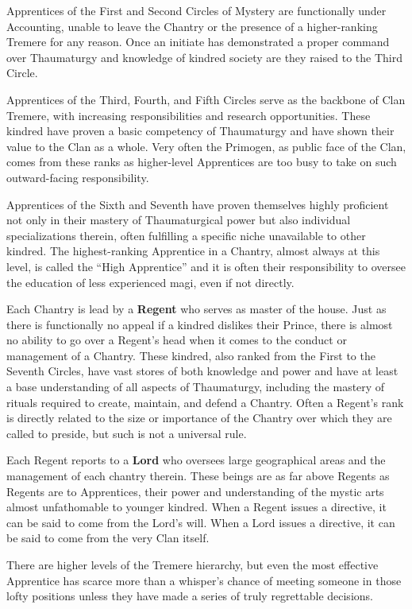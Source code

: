 Apprentices of the First and Second Circles of Mystery are functionally under Accounting, 
unable to leave the Chantry or the presence of a higher-ranking Tremere for any reason.  
Once an initiate has demonstrated a proper command over Thaumaturgy and knowledge of 
kindred society are they raised to the Third Circle.

Apprentices of the Third, Fourth, and Fifth Circles serve as the backbone of Clan Tremere, 
with increasing responsibilities and research opportunities.  These kindred have proven a 
basic competency of Thaumaturgy and have shown their value to the Clan as a whole.  Very 
often the Primogen, as public face of the Clan, comes from these ranks as higher-level 
Apprentices are too busy to take on such outward-facing responsibility.

Apprentices of the Sixth and Seventh have proven themselves highly proficient not only in 
their mastery of Thaumaturgical power but also individual specializations therein, often 
fulfilling a specific niche unavailable to other kindred.  The highest-ranking Apprentice 
in a Chantry, almost always at this level, is called the ``High Apprentice'' and it is 
often their responsibility to oversee the education of less experienced magi, even if 
not directly.

Each Chantry is lead by a \textbf{Regent} who serves as master of the house.  Just as 
there is functionally no appeal if a kindred dislikes their Prince, there is almost no 
ability to go over a Regent's head when it comes to the conduct or management of a Chantry.  
These kindred, also ranked from the First to the Seventh Circles, have vast stores of both 
knowledge and power and have at least a base understanding of all aspects of Thaumaturgy, 
including the mastery of rituals required to create, maintain, and defend a Chantry.  Often 
a Regent's rank is directly related to the size or importance of the Chantry over which they 
are called to preside, but such is not a universal rule.

Each Regent reports to a \textbf{Lord} who oversees large geographical areas and the 
management of each chantry therein.  These beings are as far above Regents as Regents are to 
Apprentices, their power and understanding of the mystic arts almost unfathomable to younger 
kindred.  When a Regent issues a directive, it can be said to come from the Lord's will.  When 
a Lord issues a directive, it can be said to come from the very Clan itself.

There are higher levels of the Tremere hierarchy, but even the most effective Apprentice has 
scarce more than a whisper's chance of meeting someone in those lofty positions unless they 
have made a series of truly regrettable decisions.

